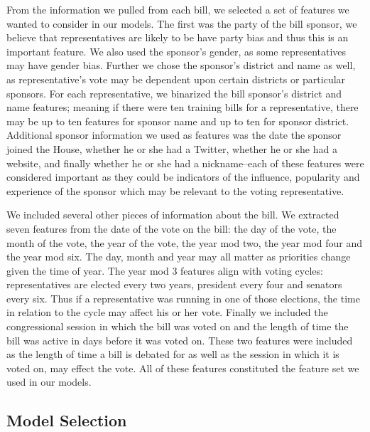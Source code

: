 \documentclass[11pt,letterpaper,twocolumn]{article}
\begin{document}
	From the information we pulled from each bill, we selected a set of features we wanted to consider in our models. The first was the party of the bill sponsor, we believe that representatives are likely to be have party bias and thus this is an important feature. We also used the sponsor's gender, as some representatives may have gender bias. Further we chose the sponsor's district and name as well, as representative's vote may be dependent upon certain districts or particular sponsors. For each representative, we binarized the bill sponsor's district and name features; meaning if there were ten training bills for a representative, there may be up to ten features for sponsor name and up to ten for sponsor district. Additional sponsor information we used as features was the date the sponsor joined the House, whether he or she had a Twitter, whether he or she had a website, and finally whether he or she had a nickname--each of these features were considered important as they could be indicators of the influence, popularity and experience of the sponsor which may be relevant to the voting representative.
	
	We included several other pieces of information about the bill. We extracted seven features from the date of the vote on the bill: the day of the vote, the month of the vote, the year of the vote, the year mod two, the year mod four and the year mod six. The day, month and year may all matter as priorities change given the time of year. The year mod 3 features align with voting cycles: representatives are elected every two years, president every four and senators every six. Thus if a representative was running in one of those elections, the time in relation to the cycle may affect his or her vote. Finally we included the congressional session in which the bill was voted on and the length of time the bill was active in days before it was voted on. These two features were included as the length of time a bill is debated for as well as the session in which it is voted on,  may effect the vote. All of these features constituted the feature set we used in our models.

\subsection{Model Selection}
\end{document}
